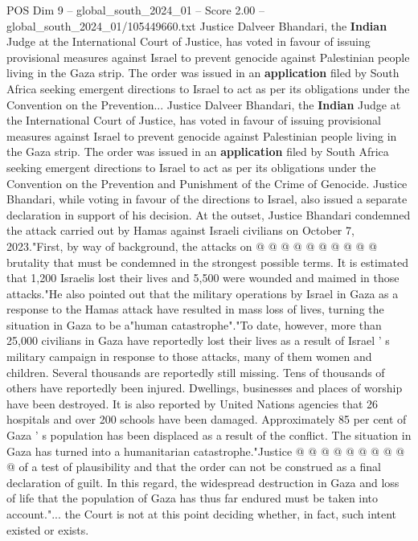 \begin{textsample}{POS Dim 9 – global\_south\_2024\_01 – Score 2.00 – global\_south\_2024\_01/105449660.txt}  \label{ex:f9_pos_015}
Justice Dalveer Bhandari, the \textbf{Indian} Judge at the International Court of Justice, has voted in favour of issuing provisional measures against Israel to prevent genocide against Palestinian people living in the Gaza strip.
The order was issued in an \textbf{application} filed by South Africa seeking emergent directions to Israel to act as per its obligations under the Convention on the Prevention...
Justice Dalveer Bhandari, the \textbf{Indian} Judge at the International Court of Justice, has voted in favour of issuing provisional measures against Israel to prevent genocide against Palestinian people living in the Gaza strip.
The order was issued in an \textbf{application} filed by South Africa seeking emergent directions to Israel to act as per its obligations under the Convention on the Prevention and Punishment of the Crime of Genocide.
Justice Bhandari, while voting in favour of the directions to Israel, also issued a separate declaration in support of his decision.
At the outset, Justice Bhandari condemned the attack carried out by Hamas against Israeli civilians on October 7, 2023."First, by way of background, the attacks on @ @ @ @ @ @ @ @ @ @ brutality that must be condemned in the strongest possible terms.
It is estimated that 1,200 Israelis lost their lives and 5,500 were wounded and maimed in those attacks."He also pointed out that the military operations by Israel in Gaza as a response to the Hamas attack have resulted in mass loss of lives, turning the situation in Gaza to be a"human catastrophe"."To date, however, more than 25,000 civilians in Gaza have reportedly lost their lives as a result of Israel ' s military campaign in response to those attacks, many of them women and children.
Several thousands are reportedly still missing.
Tens of thousands of others have reportedly been injured.
Dwellings, businesses and places of worship have been destroyed.
It is also reported by United Nations agencies that 26 hospitals and over 200 schools have been damaged.
Approximately 85 per cent of Gaza ' s population has been displaced as a result of the conflict.
The situation in Gaza has turned into a humanitarian catastrophe."Justice @ @ @ @ @ @ @ @ @ @ of a test of plausibility and that the order can not be construed as a final declaration of guilt.
In this regard, the widespread destruction in Gaza and loss of life that the population of Gaza has thus far endured must be taken into account."... the Court is not at this point deciding whether, in fact, such intent existed or exists.

\end{textsample}
